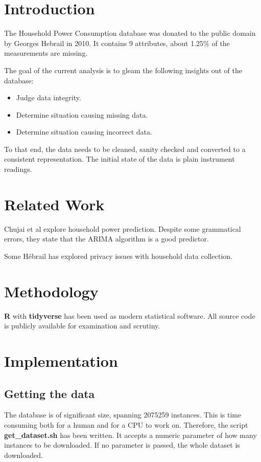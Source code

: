 \documentclass[11pt]{article}
\title{\MakeMeBlue{Comparing Measures of Dependency Amond Features: Pearson, Kendall and Spearman Corelation Coefficients}}
\author{Miroslav Vitkov}
\date{\today}
\newcommand{\code}[1]{\textbf{#1}}
\newcommand{\para}[0]{\par\vspace{0.5cm}}
\begin{document}
\maketitle

\section{Introduction}
The Household Power Consumption database was donated to the public domain by Georges Hebrail in 2010.
It contains 9 attributes, about 1.25\% of the measurements are missing.
\para
The goal of the current analysis is to gleam the following insights out of the database:
\begin{itemize}
    \item{Judge data integrity.}
    \item{Determine situation causing missing data.}
    \item{Determine situation causing incorrect data.}
\end{itemize}
\para
To that end, the data needs to be cleaned, sanity checked and converted to a consistent representation.
The initial state of the data is plain instrument readings.

\section{Related Work}
Chujai et al\cite{q1} explore household power prediction.
Despite some grammatical errors, they state that the ARIMA algorithm is a good predictor.
\para 
Some Hébrail has explored privacy issues with household data collection\cite{q2}.
\section{Methodology}
\code{R} with \code{tidyverse} has been used as modern statistical software.
All source code is publicly available for examination and scrutiny.

\section{Implementation}
\subsection{Getting the data}
The database is of significant size, spanning 2075259 instances.
This is time consuming both for a human and for a CPU to work on.
Therefore, the script \code{get\_dataset.sh} has been written.
It accepts a numeric parameter of how many instances to be downloaded.
If no parameter is passed, the whole dataset is downloaded.
\end{document}
